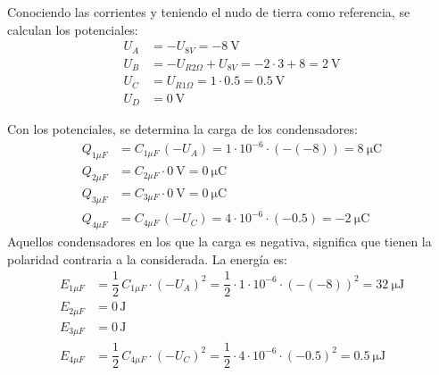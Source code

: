 Conociendo las corrientes y teniendo el nudo de tierra como
referencia, se calculan los potenciales:
\begin{align*}
  U_A&=-U_{8V}=\qty{-8}{\volt}\\
  U_B&=-U_{R2\Omega}+U_{8V}=-2\cdot 3+8=\qty{2}{\volt}\\
  U_C&=U_{R1\Omega}=1\cdot 0.5=\qty{0.5}{\volt}\\
  U_D&=\qty{0}{\volt}
\end{align*}

Con los potenciales, se determina la carga de los condensadores:
\begin{align*}
  Q_{1\mu F}&=C_{1\mu F}\, (-U_{A}) = 1\cdot 10^{-6}\cdot (-(-8))=\qty{8}{\micro\coulomb}\\
  Q_{2\mu F}&=C_{2\mu F} \cdot \qty{0}{\volt} = \qty{0}{\micro\coulomb}\\
  Q_{3\mu F}&=C_{3\mu F} \cdot \qty{0}{\volt} = \qty{0}{\micro\coulomb}\\
  Q_{4\mu F}&=C_{4\mu F}\, (-U_C) = 4\cdot 10^{-6}\cdot (-0.5)=\qty{-2}{\micro\coulomb}
\end{align*}
Aquellos condensadores en los que la carga es negativa, significa que
tienen la polaridad contraria a la considerada. La energía es:
\begin{align*}
  E_{1\mu F}&=\dfrac{1}{2}\,C_{1\mu F}\cdot (-U_{A})^2 = \dfrac{1}{2}\cdot 1\cdot 10^{-6}\cdot (-(-8))^2=\qty{32}{\micro\joule}\\
  E_{2\mu F}&=0\,\text{J}\\
  E_{3\mu F}&=0\,\text{J}\\
  E_{4\mu F}&=\dfrac{1}{2}\,C_{4\mu F}\cdot (-U_{C})^2 = \dfrac{1}{2}\cdot 4\cdot 10^{-6}\cdot (-0.5)^2=\qty{0.5}{\micro\joule}
\end{align*}

